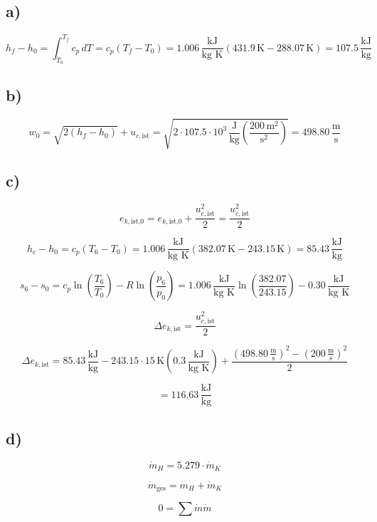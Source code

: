 \subsection*{a)}

\[
h_f - h_0 = \int_{T_0}^{T_f} c_p \, dT = c_p (T_f - T_0) = 1.006 \, \frac{\text{kJ}}{\text{kg K}} (431.9 \, \text{K} - 288.07 \, \text{K}) = 107.5 \, \frac{\text{kJ}}{\text{kg}}
\]

\subsection*{b)}

\[
w_0 = \sqrt{2(h_f - h_0)} + u_{c, \text{ist}} = \sqrt{2 \cdot 107.5 \cdot 10^3 \, \frac{\text{J}}{\text{kg}} \left( \frac{200 \, \text{m}^2}{\text{s}^2} \right)} = 498.80 \, \frac{\text{m}}{\text{s}}
\]

\subsection*{c)}

\[
e_{k, \text{ist,0}} = e_{k, \text{ist,0}} + \frac{u_{c, \text{ist}}^2}{2} = \frac{u_{c, \text{ist}}^2}{2}
\]

\[
h_c - h_0 = c_p (T_6 - T_0) = 1.006 \, \frac{\text{kJ}}{\text{kg K}} (382.07 \, \text{K} - 243.15 \, \text{K}) = 85.43 \, \frac{\text{kJ}}{\text{kg}}
\]

\[
s_6 - s_0 = c_p \ln \left( \frac{T_6}{T_0} \right) - R \ln \left( \frac{p_6}{p_0} \right) = 1.006 \, \frac{\text{kJ}}{\text{kg K}} \ln \left( \frac{382.07}{243.15} \right) - 0.30 \, \frac{\text{kJ}}{\text{kg K}}
\]

\[
\Delta e_{k, \text{ist}} = \frac{u_{c, \text{ist}}^2}{2}
\]

\[
\Delta e_{k, \text{ist}} = 85.43 \, \frac{\text{kJ}}{\text{kg}} - 243.15 \cdot 15 \, \text{K} (0.3 \, \frac{\text{kJ}}{\text{kg K}}) + \frac{(498.80 \, \frac{\text{m}}{\text{s}})^2 - (200 \, \frac{\text{m}}{\text{s}})^2}{2}
\]

\[
= 116.63 \, \frac{\text{kJ}}{\text{kg}}
\]

\subsection*{d)}

\[
\dot{m}_H = 5.279 \cdot \dot{m}_K
\]

\[
\dot{m}_{\text{ges}} = \dot{m}_H + \dot{m}_K
\]

\[
0 = \sum \dot{m} \dot{m}
\]

